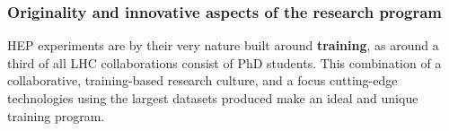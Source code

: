 


 
\vspace{-2mm}
\subsubsection{Originality and innovative aspects of the research program} 
\label{sub:Originality}

HEP experiments are by their very nature built around \textbf{training}, as around a third of all LHC collaborations consist of PhD students.
This combination of a collaborative, training-based research culture, and a focus cutting-edge technologies using the largest datasets produced make \acronym an ideal and unique training program.

